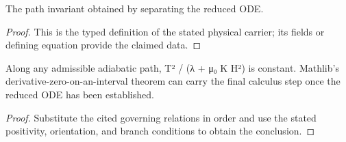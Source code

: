 \begin{definition}
  \label{def:physics:IPhO_2026_3_B_2:aux023}
  The path invariant obtained by separating the reduced ODE.
\end{definition}
\begin{proof}
  This is the typed definition of the stated physical carrier; its fields or defining equation provide the claimed data.
\end{proof}

\begin{lemma}
  \label{lem:physics:IPhO_2026_3_B_2:aux024}
  Along any admissible adiabatic path, T² / (λ + μ₀ K H²) is constant. Mathlib's derivative-zero-on-an-interval theorem can carry the final calculus step once the reduced ODE has been established.
\end{lemma}
\begin{proof}
  Substitute the cited governing relations in order and use the stated positivity, orientation, and branch conditions to obtain the conclusion.
\end{proof}
